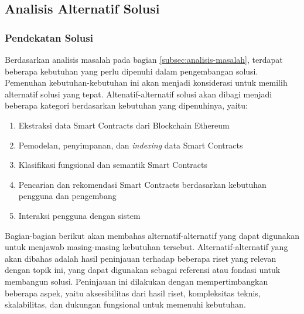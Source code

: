\subsection{Analisis Alternatif Solusi}
\label{subsec:analisis-alternatif-solusi}

\subsubsection{Pendekatan Solusi}
Berdasarkan analisis masalah pada bagian \ref{subsec:analisis-masalah}, terdapat beberapa kebutuhan yang perlu dipenuhi dalam pengembangan solusi. Pemenuhan kebutuhan-kebutuhan ini akan menjadi konsiderasi untuk memilih alternatif solusi yang tepat. Altenatif-alternatif solusi akan dibagi menjadi beberapa kategori berdasarkan kebutuhan yang dipenuhinya, yaitu:

\begin{enumerate}
  \item Ekstraksi data Smart Contracts dari Blockchain Ethereum
  \item Pemodelan, penyimpanan, dan \textit{indexing} data Smart Contracts
  \item Klasifikasi fungsional dan semantik Smart Contracts
  \item Pencarian dan rekomendasi Smart Contracts berdasarkan kebutuhan pengguna dan pengembang
  \item Interaksi pengguna dengan sistem
\end{enumerate}

Bagian-bagian berikut akan membahas alternatif-alternatif yang dapat digunakan untuk menjawab masing-masing kebutuhan tersebut. Alternatif-alternatif yang akan dibahas adalah hasil peninjauan terhadap beberapa riset yang relevan dengan topik ini, yang dapat digunakan sebagai referensi atau fondasi untuk membangun solusi. Peninjauan ini dilakukan dengan mempertimbangkan beberapa aspek, yaitu aksesibilitas dari hasil riset, kompleksitas teknis, skalabilitas, dan dukungan fungsional untuk memenuhi kebutuhan.





